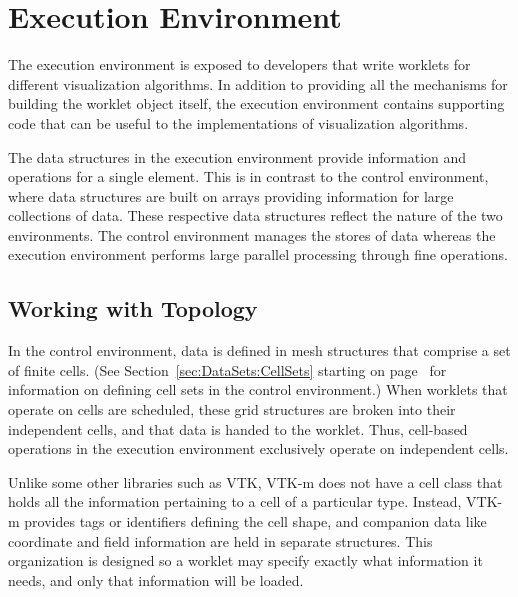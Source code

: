
\chapter{Execution Environment}
\label{chap:ExecutionEnvironment}


The execution environment is exposed to developers that write worklets for
different visualization algorithms. In addition to providing all the
mechanisms for building the worklet object itself, the execution
environment contains supporting code that can be useful to the
implementations of visualization algorithms.

The data structures in the execution environment provide information and
operations for a single element. This is in contrast to the control
environment, where data structures are built on arrays providing
information for large collections of data. These respective data structures
reflect the nature of the two environments. The control environment manages
the stores of data whereas the execution environment performs large
parallel processing through fine operations.

\section{Working with Topology}
\label{sec:ExecutionEnvironment:WorkingWithTopology}

In the control environment, data is defined in mesh structures that
comprise a set of finite cells. (See Section~\ref{sec:DataSets:CellSets}
starting on page~\pageref{sec:DataSets:CellSets} for information on
defining cell sets in the control environment.) When worklets that operate
on cells are scheduled, these grid structures are broken into their
independent cells, and that data is handed to the worklet. Thus, cell-based
operations in the execution environment exclusively operate on independent
cells.

Unlike some other libraries such as VTK, VTK-m does not have a cell class
that holds all the information pertaining to a cell of a particular type.
Instead, VTK-m provides tags or identifiers defining the cell shape, and
companion data like coordinate and field information are held in separate
structures. This organization is designed so a worklet may specify exactly
what information it needs, and only that information will be loaded.

